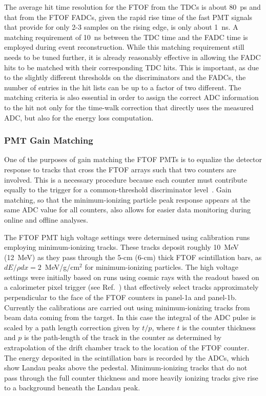 \documentclass[3p,times,twocolumn]{elsarticle}
\begin{document}
The average hit time resolution for the FTOF from the TDCs is about 80~ps and that from the FTOF
FADCs, given the rapid rise time of the fast PMT signals that provide for only 2-3 samples on the rising
edge, is only about 1~ns. A matching requirement of 10~ns between the TDC time and the FADC time is
employed during event reconstruction. While this matching requirement still needs to be tuned further,
it is already reasonably effective in allowing the FADC hits to be matched with their corresponding TDC
hits. This is important, as due to the slightly different thresholds on the discriminators and the FADCs, the
number of entries in the hit lists can be up to a factor of two different. The matching criteria is also
essential in order to assign the correct ADC information to the hit not only for the time-walk correction
that directly uses the measured ADC, but also for the energy loss computation.

\subsubsection{PMT Gain Matching}
\label{gain-matching}

One of the purposes of gain matching the FTOF PMTs is to equalize the detector response to tracks that
cross the FTOF arrays such that two counters are involved. This is a necessary procedure because each
counter must contribute equally to the trigger for a common-threshold discriminator level~\cite{trigger-nim}.
Gain matching, so that the minimum-ionizing particle peak response appears at the same ADC value for all
counters, also allows for easier data monitoring during online and offline analyses.

The FTOF PMT high voltage settings were determined using calibration runs employing minimum-ionizing
tracks. These tracks deposit roughly 10~MeV (12~MeV) as they pass through the 5-cm (6-cm) thick FTOF
scintillation bars, as $dE/\rho dx = 2$~MeV/g/cm$^2$ for minimum-ionizing particles. The high voltage
settings were initially based on runs using cosmic rays with the readout based on a calorimeter pixel trigger
(see Ref.~\cite{ec-nim}) that effectively select tracks approximately perpendicular to the face of the FTOF
counters in panel-1a and panel-1b. Currently the calibrations are carried out using minimum-ionizing tracks from
beam data coming from the target. In this case the integral of the ADC pulse is scaled by a path length
correction given by $t/p$, where $t$ is the counter thickness and $p$ is the path-length of the track in the
counter as determined by extrapolation of the drift chamber track to the location of the FTOF counter. The
energy deposited in the scintillation bars is recorded by the ADCs,  which show Landau peaks above the pedestal.
Minimum-ionizing tracks that do not pass through the full counter thickness and more heavily ionizing tracks give
rise to a background beneath the Landau peak.
\end{document}
